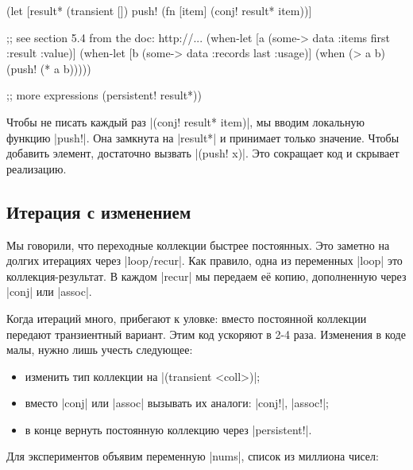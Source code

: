 \begin{english}
  \begin{clojure}
(let [result* (transient [])
      push! (fn [item]
              (conj! result* item))]

  ;; see section 5.4 from the doc: http://...
  (when-let [a (some-> data :items first :result :value)]
    (when-let [b (some-> data :records last :usage)]
      (when (> a b)
        (push! (* a b)))))

  ;; more expressions
  (persistent! result*))
  \end{clojure}
\end{english}


Чтобы не писать каждый раз \spverb|(conj! result* item)|, мы
вводим локальную функцию \spverb|push!|. Она замкнута на \spverb|result*| и
принимает только значение. Чтобы добавить элемент, достаточно вызвать
\spverb|(push! x)|. Это сокращает код и скрывает реализацию.

\subsection{Итерация с изменением}


Мы говорили, что переходные коллекции быстрее постоянных. Это заметно на долгих
итерациях через \spverb|loop/recur|. Как правило, одна из переменных
\spverb|loop| это коллекция-результат. В каждом \spverb|recur| мы передаем е\"{е}
копию, дополненную через \spverb|conj| или \spverb|assoc|.

Когда итераций много, прибегают к уловке: вместо постоянной коллекции передают
транзиентный вариант. Этим код ускоряют в 2-4 раза. Изменения в коде малы,
нужно лишь учесть следующее:

\begin{itemize}

\item
  изменить тип коллекции на \spverb|(transient <coll>)|;

\item
  вместо \spverb|conj| или \spverb|assoc| вызывать их аналоги: \spverb|conj!|,
  \spverb|assoc!|;

\item
  в конце вернуть постоянную коллекцию через \spverb|persistent!|.

\end{itemize}

Для экспериментов объявим переменную \spverb|nums|, список из миллиона чисел:

